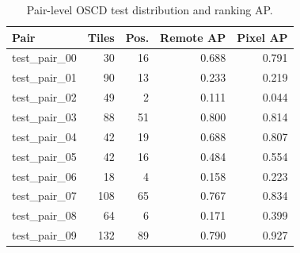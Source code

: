 \begin{table}[t]
\caption{Pair-level OSCD test distribution and ranking AP.}
\label{tab:pairs}
\centering
\begin{tabular}{lrrrr}
\hline
Pair & Tiles & Pos. & Remote AP & Pixel AP \\
\hline
test\_pair\_00 & 30 & 16 & 0.688 & 0.791 \\
test\_pair\_01 & 90 & 13 & 0.233 & 0.219 \\
test\_pair\_02 & 49 & 2 & 0.111 & 0.044 \\
test\_pair\_03 & 88 & 51 & 0.800 & 0.814 \\
test\_pair\_04 & 42 & 19 & 0.688 & 0.807 \\
test\_pair\_05 & 42 & 16 & 0.484 & 0.554 \\
test\_pair\_06 & 18 & 4 & 0.158 & 0.223 \\
test\_pair\_07 & 108 & 65 & 0.767 & 0.834 \\
test\_pair\_08 & 64 & 6 & 0.171 & 0.399 \\
test\_pair\_09 & 132 & 89 & 0.790 & 0.927 \\
\hline
\end{tabular}
\end{table}
